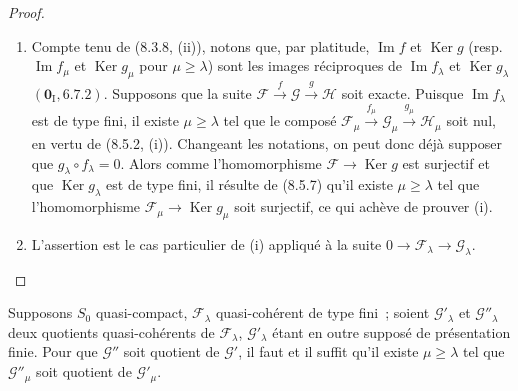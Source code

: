 \begin{proof}
\begin{enumerate}[label=(\roman*)]
  \item Compte tenu de (8.3.8, (ii)), notons que, par platitude,
  $\operatorname{Im}f$ et $\operatorname{Ker}g$ (resp.
  $\operatorname{Im}f_\mu$ et $\operatorname{Ker}g_\mu$ pour
  $\mu\geq\lambda$) sont les images réciproques de
  $\operatorname{Im}f_\lambda$ et $\operatorname{Ker}g_\lambda$
  $(\mathbf{0}_{\mathrm I},6.7.2)$. Supposons que la suite
  $\mathcal F\xrightarrow{f}\mathcal G\xrightarrow{g}\mathcal H$ soit exacte.
  Puisque $\operatorname{Im}f_\lambda$ est de type fini, il existe
  $\mu\geq\lambda$ tel que le composé
  $\mathcal F_\mu\xrightarrow{f_\mu}\mathcal G_\mu
  \xrightarrow{g_\mu}\mathcal H_\mu$ soit nul, en vertu de (8.5.2, (i)).
  Changeant les notations, on peut donc déjà supposer que
  $g_\lambda\circ f_\lambda=0$. Alors comme l'homomorphisme
  $\mathcal F\to\operatorname{Ker}g$ est surjectif et que
  $\operatorname{Ker}g_\lambda$ est de type fini, il résulte de (8.5.7) qu'il
  existe $\mu\geq\lambda$ tel que l'homomorphisme
  $\mathcal F_\mu\to\operatorname{Ker}g_\mu$ soit surjectif, ce qui achève de
  prouver (i).

  \item L'assertion est le cas particulier de (i) appliqué à la suite
  $0\to\mathcal F_\lambda\to\mathcal G_\lambda$.
\end{enumerate}
\end{proof}

\begin{lemma}[8.5.9]
\label{IV.8.5.9-fr}
Supposons $S_0$ quasi-compact, $\mathcal F_\lambda$ quasi-cohérent de type
fini~; soient $\mathcal G'_\lambda$ et $\mathcal G''_\lambda$ deux quotients
quasi-cohérents de $\mathcal F_\lambda$, $\mathcal G'_\lambda$ étant en outre
supposé de présentation finie. Pour que $\mathcal G''$ soit quotient de
$\mathcal G'$, il faut et il suffit qu'il existe $\mu\geq\lambda$ tel que
$\mathcal G''_\mu$ soit quotient de $\mathcal G'_\mu$.
\end{lemma}

